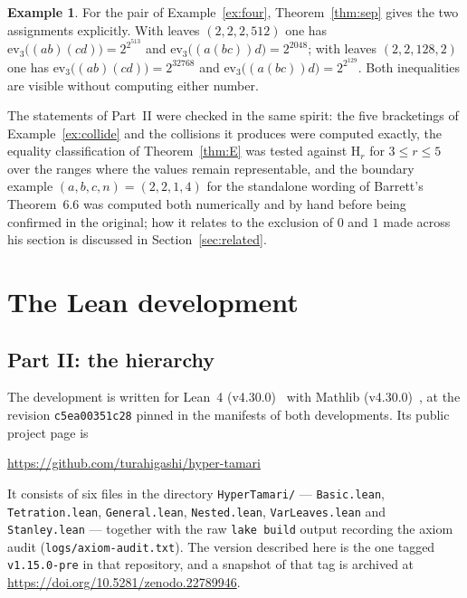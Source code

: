 \documentclass[11pt,a4paper]{article}
\theoremstyle{plain}
\theoremstyle{definition}
\newtheorem{example}[theorem]{Example}
\newcommand{\HH}{\mathrm{H}}
\newcommand{\ev}{\mathrm{ev}}
\begin{document}
\begin{example}\label{ex:sep512}
For the pair of Example~\ref{ex:four}, Theorem~\ref{thm:sep} gives the two assignments
explicitly. With leaves $(2,2,2,512)$ one has
$\ev_3\bigl((ab)(cd)\bigr)=2^{2^{513}}$ and $\ev_3\bigl((a(bc))d\bigr)=2^{2048}$; with
leaves $(2,2,128,2)$ one has $\ev_3\bigl((ab)(cd)\bigr)=2^{32768}$ and
$\ev_3\bigl((a(bc))d\bigr)=2^{2^{129}}$. Both inequalities are visible without computing
either number.
\end{example}

The statements of Part~II were checked in the same spirit: the five bracketings of
Example~\ref{ex:collide} and the collisions it produces were computed exactly, the
equality classification of Theorem~\ref{thm:E} was tested against $\HH_r$ for
$3\le r\le5$ over the ranges where the values remain representable, and the
boundary example $(a,b,c,n)=(2,2,1,4)$ for the standalone wording of Barrett's
Theorem~6.6 was computed both numerically and by hand before being confirmed in the
original; how it relates to the exclusion of $0$ and $1$ made across his section is
discussed in Section~\ref{sec:related}.
\section{The Lean development}\label{sec:formal}

\subsection{Part II: the hierarchy}

The development is written for Lean~4 (v4.30.0)~\cite{Lean4} with
Mathlib (v4.30.0)~\cite{Mathlib}, at the revision
\texttt{c5ea00351c28} pinned in the manifests of both developments. Its public
project page is
\begin{center}
\url{https://github.com/turahigashi/hyper-tamari}
\end{center}
It consists of six files in the directory \verb|HyperTamari/| ---
\verb|Basic.lean|, \verb|Tetration.lean|, \verb|General.lean|, \verb|Nested.lean|,
\verb|VarLeaves.lean| and \verb|Stanley.lean| --- together with the raw
\verb|lake build| output recording the axiom audit
(\verb|logs/axiom-audit.txt|). The version described here is the one tagged
\verb|v1.15.0-pre| in that repository, and a snapshot of that tag is archived at
\url{https://doi.org/10.5281/zenodo.22789946}.
\end{document}
